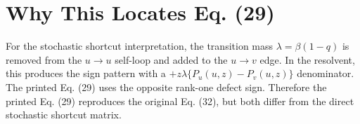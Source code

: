 \documentclass[11pt]{article}
\begin{document}
\section*{Why This Locates Eq. (29)}

For the stochastic shortcut interpretation, the transition mass
\(\lambda=\beta(1-q)\) is removed from the \(u\to u\) self-loop and added to
the \(u\to v\) edge.  In the resolvent, this produces the sign pattern with a
\(+z\lambda\{P_u(u,z)-P_v(u,z)\}\) denominator.  The printed Eq. (29) uses the
opposite rank-one defect sign.  Therefore the printed Eq. (29) reproduces the
original Eq. (32), but both differ from the direct stochastic shortcut matrix.
\end{document}
